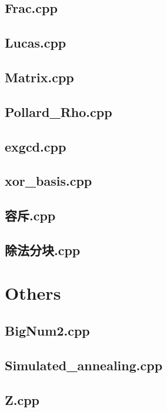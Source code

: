 \subsection{Frac.cpp}

\subsection{Lucas.cpp}

\subsection{Matrix.cpp}

\subsection{Pollard\_Rho.cpp}

\subsection{exgcd.cpp}

\subsection{xor\_basis.cpp}

\subsection{容斥.cpp}

\subsection{除法分块.cpp}

\section{Others}
\subsection{BigNum2.cpp}

\subsection{Simulated\_annealing.cpp}

\subsection{Z.cpp}

